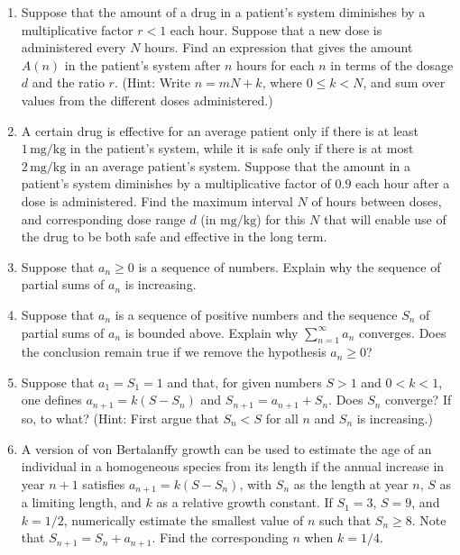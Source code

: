 \documentclass{exercises}
\begin{document}
\begin{enumerate}[resume]
\begin{enumerate}[label=(\alph*)]
  \item Find the first eight terms of the sequence.
  \item How much interest has accumulated after $2$ years?
\end{enumerate}
\item \techrequired Suppose that the amount of a drug in a patient's system diminishes by a multiplicative factor $r<1$ each hour. Suppose that a new dose is administered every $N$ hours. Find an expression that gives the amount $A(n)$ in the patient's system after $n$ hours for each $n$ in terms of the dosage $d$ and the ratio $r$. (Hint: Write $n=mN+k$, where $0\le k<N$, and sum over values from the different doses administered.)
\item \techrequired A certain drug is effective for an average patient only if there is at least $1\,\text{mg}/\text{kg}$ in the patient's system, while it is safe only if there is at most $2\,\text{mg}/\text{kg}$ in an average patient's system. Suppose that the amount in a patient's system diminishes by a multiplicative factor of $0.9$ each hour after a dose is administered. Find the maximum interval $N$ of hours between doses, and corresponding dose range $d$ (in $\text{mg}/\text{kg}$) for this $N$ that will enable use of the drug to be both safe and effective in the long term.
\item Suppose that $a_{n}\ge0$ is a sequence of numbers. Explain why the sequence of partial sums of $a_{n}$ is increasing.
\item \techrequired Suppose that $a_{n}$ is a sequence of positive numbers and the sequence $S_{n}$ of partial sums of $a_{n}$ is bounded above. Explain why $\sum_{n=1}^{\infty}a_{n}$ converges. Does the conclusion remain true if we remove the hypothesis $a_{n}\ge0$?
\item \techrequired Suppose that $a_{1}=S_{1}=1$ and that, for given numbers $S>1$ and $0<k<1$, one defines $a_{n+1}=k(S-S_{n})$ and $S_{n+1}=a_{n+1}+S_{n}$. Does $S_{n}$ converge? If so, to what? (Hint: First argue that $S_{n}<S$ for all $n$ and $S_{n}$ is increasing.)
\item \techrequired A version of von Bertalanffy growth can be used to estimate the age of an individual in a homogeneous species from its length if the annual increase in year $n+1$ satisfies $a_{n+1}=k(S-S_{n})$, with $S_{n}$ as the length at year $n$, $S$ as a limiting length, and $k$ as a relative growth constant. If $S_{1}=3$, $S=9$, and $k=1/2$, numerically estimate the smallest value of $n$ such that $S_{n}\ge8$. Note that $S_{n+1}=S_{n}+a_{n+1}$. Find the corresponding $n$ when $k=1/4$.

\end{enumerate}
\end{document}
